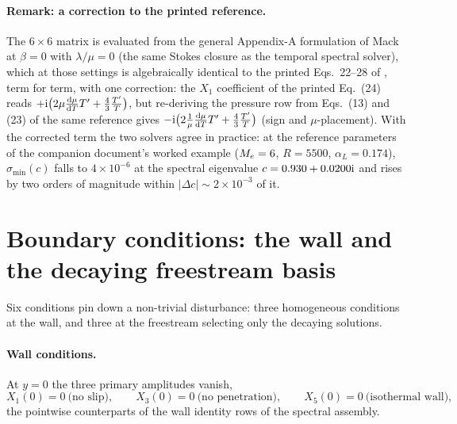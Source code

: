 \documentclass[11pt]{article}
\begin{document}
\paragraph{Remark: a correction to the printed reference.} The $6\times6$ matrix is evaluated from
the general Appendix-A formulation of Mack \cite{mack1984} at $\beta=0$ with $\lambda/\mu=0$
(the same Stokes closure as the temporal spectral solver), which at those settings is algebraically
identical to the printed Eqs.~22--28 of \cite{ozgen2008}, term for term, with one correction: the
$X_1$ coefficient of the printed Eq.~(24) reads
$+\mathrm{i}\big(2\mu\tfrac{\mathrm d\mu}{\mathrm dT}T'+\tfrac43\tfrac{T'}{T}\big)$, but re-deriving the
pressure row from Eqs.~(13) and (23) of the same reference gives
$-\mathrm{i}\big(2\tfrac1\mu\tfrac{\mathrm d\mu}{\mathrm dT}T'+\tfrac43\tfrac{T'}{T}\big)$ (sign and
$\mu$-placement). With the corrected term the two solvers agree in practice: at the reference
parameters of the companion document's worked example ($M_e=6$, $R=5500$, $\alpha_L=0.174$),
$\sigma_{\min}(c)$ falls to $4\times10^{-6}$ at the spectral eigenvalue $c=0.930+0.0200\mathrm{i}$ and
rises by two orders of magnitude within $|\Delta c|\sim2\times10^{-3}$ of it.

\section{Boundary conditions: the wall and the decaying freestream basis}\label{sec:shoot-bc}
Six conditions pin down a non-trivial disturbance: three homogeneous conditions at the wall, and
three at the freestream selecting only the decaying solutions.

\paragraph{Wall conditions.} At $y=0$ the three primary amplitudes vanish,
\begin{equation}\label{eq:wallbc}
  X_1(0)=0\ \text{(no slip)},\qquad X_3(0)=0\ \text{(no penetration)},\qquad
  X_5(0)=0\ \text{(isothermal wall)},
\end{equation}
the pointwise counterparts of the wall identity rows of the spectral assembly.
\end{document}

